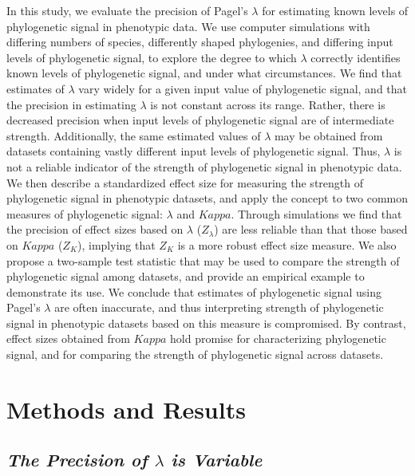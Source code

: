 \documentclass[
]{article}
\begin{document}
In this study, we evaluate the precision of Pagel's \(\lambda\) for
estimating known levels of phylogenetic signal in phenotypic data. We
use computer simulations with differing numbers of species, differently
shaped phylogenies, and differing input levels of phylogenetic signal,
to explore the degree to which \(\lambda\) correctly identifies known
levels of phylogenetic signal, and under what circumstances. We find
that estimates of \(\lambda\) vary widely for a given input value of
phylogenetic signal, and that the precision in estimating \(\lambda\) is
not constant across its range. Rather, there is decreased precision when
input levels of phylogenetic signal are of intermediate strength.
Additionally, the same estimated values of \(\lambda\) may be obtained
from datasets containing vastly different input levels of phylogenetic
signal. Thus, \(\lambda\) is not a reliable indicator of the strength of
phylogenetic signal in phenotypic data. We then describe a standardized
effect size for measuring the strength of phylogenetic signal in
phenotypic datasets, and apply the concept to two common measures of
phylogenetic signal: \(\lambda\) and \(Kappa\). Through simulations we
find that the precision of effect sizes based on \(\lambda\)
(\(Z_{\lambda}\)) are less reliable than that those based on \(Kappa\)
(\(Z_K\)), implying that \(Z_K\) is a more robust effect size measure.
We also propose a two-sample test statistic that may be used to compare
the strength of phylogenetic signal among datasets, and provide an
empirical example to demonstrate its use. We conclude that estimates of
phylogenetic signal using Pagel's \(\lambda\) are often inaccurate, and
thus interpreting strength of phylogenetic signal in phenotypic datasets
based on this measure is compromised. By contrast, effect sizes obtained
from \(Kappa\) hold promise for characterizing phylogenetic signal, and
for comparing the strength of phylogenetic signal across datasets.

\hypertarget{methods-and-results}{%
\section{Methods and Results}\label{methods-and-results}}

\hypertarget{the-precision-of-lambda-is-variable}{%
\subsection{\texorpdfstring{\emph{The Precision of \(\lambda\) is
Variable}}{The Precision of \textbackslash lambda is Variable}}\label{the-precision-of-lambda-is-variable}}
\end{document}
